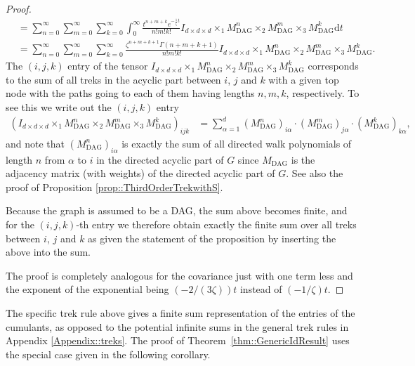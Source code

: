 \documentclass{biometrika}
\begin{document}
\begin{proof}
\begin{align*}
        &= \sum_{n = 0}^{\infty} \sum_{m = 0}^{\infty} \sum_{k = 0}^{\infty} \int_{0}^{\infty} \frac{t^{n+m+k} e^{- \frac{1}{\zeta} t }}{n! m! k!}  
        I_{d \times d \times d} \times_1  M_{\mathrm{DAG}}^n \times_2 M_{\mathrm{DAG}}^m \times_3  M_{\mathrm{DAG}}^k \mathrm{d} t \\ 
        &=  \sum_{n = 0}^{\infty} \sum_{m = 0}^{\infty} \sum_{k = 0}^{\infty} \frac{\zeta^{n+m+k+1}  \Gamma(n+m+k+1)}{n! m! k!} 
        I_{d \times d \times d} \times_1  M_{\mathrm{DAG}}^n \times_2 M_{\mathrm{DAG}}^m \times_3  M_{\mathrm{DAG}}^k. 
    \end{align*}
The $(i,j,k)$ entry of the tensor $I_{d \times d \times d} \times_1  M_{\mathrm{DAG}}^n \times_2 M_{\mathrm{DAG}}^m \times_3  M_{\mathrm{DAG}}^k$ corresponds to the sum of all treks in the acyclic part between $i$, $j$ and $k$ with a given top node with the paths going to each of them having lengths $n,m,k$, respectively. To see this we write out the $(i,j,k)$ entry 
\begin{align*}
    \left(I_{d \times d \times d} \times_1  M^n_{\mathrm{DAG}} \times_2 M^m_{\mathrm{DAG}} \times_3  M^k_{\mathrm{DAG}}\right)_{i j k} &= \sum_{\alpha = 1}^{d} 
     (M^{n}_{\mathrm{DAG}})_{i \alpha} \cdot (M^{m}_{\mathrm{DAG}})_{j \alpha} \cdot (M^{k}_{\mathrm{DAG}})_{k \alpha},
\end{align*} 
and note that $(M^n_{\mathrm{DAG}})_{i \alpha}$ is exactly the sum of all directed walk polynomials of length $n$ from $\alpha$ to $i$ in the directed acyclic part of $G$ since $M_{\mathrm{DAG}}$ is the adjacency matrix (with weights) of the directed acyclic part of $G$. See also 
the proof of Proposition \ref{prop::ThirdOrderTrekwithS}. 

Because the graph is assumed to be a DAG, the sum above becomes finite, and for the $(i,j,k)$-th entry we therefore obtain exactly the finite sum over all treks between $i$, $j$ and $k$ as given the statement of the proposition by inserting the above into the sum. 

The proof is completely analogous for the covariance just with one term less and the exponent of the exponential being $(-2/(3 \zeta)) t$ instead of $(- 1/ \zeta) t$. 
\end{proof}

The specific trek rule above gives a finite sum representation of the entries of the cumulants, as opposed to the potential infinite sums in the general trek rules in Appendix \ref{Appendix::treks}.
The proof of Theorem~\ref{thm::GenericIdResult} uses the special case given in the following 
corollary.
\end{document}
